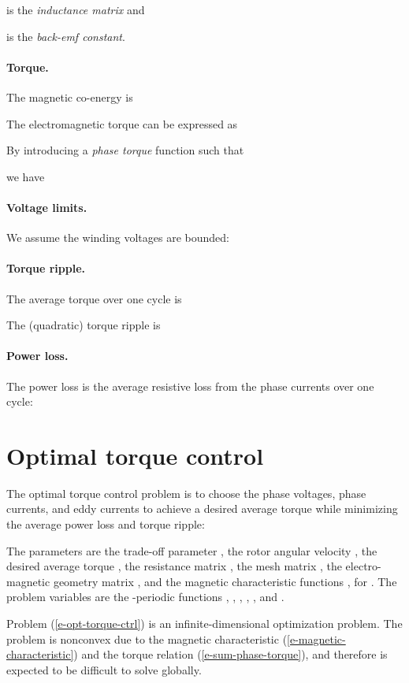 \documentclass[11pt]{article}
\begin{document}
is the \emph{inductance matrix} and 

is the \emph{back-emf constant}. 




\paragraph{Torque.}
The magnetic co-energy is

The electromagnetic torque can be expressed as

By introducing a \emph{phase torque} function  such that 

we have 


\paragraph{Voltage limits.}
We assume the winding voltages are bounded:



\paragraph{Torque ripple.}
The average torque over one cycle is 

The (quadratic) torque ripple is


\paragraph{Power loss.}
The power loss is the average resistive loss from the phase
currents over one cycle:


\section{Optimal torque control}
The optimal torque control problem is to 
choose the phase voltages, phase currents, and eddy currents 
to achieve a desired average
torque while minimizing the average power loss and torque ripple:

The parameters are the trade-off parameter ,
the rotor angular velocity , 
the desired average torque ,
the resistance matrix ,
the mesh matrix ,
the electro-magnetic geometry matrix ,
and the magnetic characteristic functions , for .
The problem variables are the -periodic functions
, , , , , and .

Problem (\ref{e-opt-torque-ctrl})
is an infinite-dimensional optimization problem.
The problem is nonconvex
due to the magnetic characteristic (\ref{e-magnetic-characteristic})
and the torque relation (\ref{e-sum-phase-torque}),
and therefore is expected to be difficult to solve globally.
\end{document}
